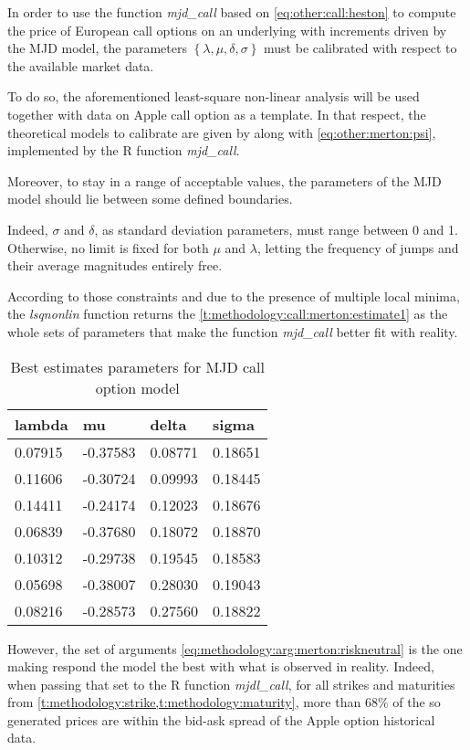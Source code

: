 \documentclass[a4paper, 12pt]{report}
\begin{document}
In order to use the function \textit{mjd\_call} based on \cref{eq:other:call:heston} to compute the price of European call options on an underlying with increments driven by the MJD model, the parameters $\left\{ \lambda, \mu, \delta ,\sigma \right\}$ must be calibrated with respect to the available market data.

To do so, the aforementioned least-square non-linear analysis will be used together with data on Apple call option as a template.
In that respect, the theoretical models to calibrate are given by  along with \cref{eq:other:merton:psi}, implemented by the R function \textit{mjd\_call}.

Moreover, to stay in a range of acceptable values, the parameters of the MJD model should lie between some defined boundaries. 

Indeed, $\sigma$ and $\delta$, as standard deviation parameters, must range between 0 and 1. 
Otherwise, no limit is fixed for both $\mu$ and $\lambda$, letting the frequency of jumps and their average magnitudes entirely free.

According to those constraints and due to the presence of multiple local minima, the \textit{lsqnonlin} function returns the \cref{t:methodology:call:merton:estimate1} as the whole sets of parameters that make the function \textit{mjd\_call} better fit with reality.

\begin{table}[h]
\centering
\begin{tabular}{llll}
  \hline
lambda & mu & delta & sigma \\ 
  \hline
0.07915 & -0.37583 & 0.08771 & 0.18651 \\ 
  0.11606 & -0.30724 & 0.09993 & 0.18445 \\ 
  0.14411 & -0.24174 & 0.12023 & 0.18676 \\ 
  0.06839 & -0.37680 & 0.18072 & 0.18870 \\ 
  0.10312 & -0.29738 & 0.19545 & 0.18583 \\ 
  0.05698 & -0.38007 & 0.28030 & 0.19043 \\ 
  0.08216 & -0.28573 & 0.27560 & 0.18822 \\ 
   \hline
\end{tabular}
\caption{Best estimates parameters for MJD call option model} 
\end{table}

However, the set of arguments \ref{eq:methodology:arg:merton:riskneutral} is the one making respond the model the best with what is observed in reality.
Indeed, when passing that set to the R function \textit{mjdl\_call}, for all strikes and maturities from \cref{t:methodology:strike,t:methodology:maturity}, more than $68\%$ of the so generated prices are within the bid-ask spread of the Apple option historical data.
\end{document}
